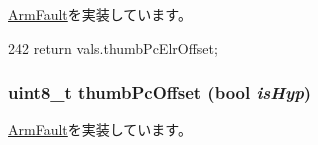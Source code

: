 \hyperlink{classArmISA_1_1ArmFault_a846a83fa30036c124fe623647dd70c5d}{ArmFault}を実装しています。


\begin{DoxyCode}
242 { return vals.thumbPcElrOffset; }
\end{DoxyCode}
\hypertarget{classArmISA_1_1ArmFaultVals_ad8a859e85912fae683d889d24bedfe08}{
\subsubsection[{thumbPcOffset}]{\setlength{\rightskip}{0pt plus 5cm}uint8\_\-t thumbPcOffset (bool {\em isHyp})}}
\label{classArmISA_1_1ArmFaultVals_ad8a859e85912fae683d889d24bedfe08}


\hyperlink{classArmISA_1_1ArmFault_a5622623cc4ac5dfcc5b2c78c41997ce4}{ArmFault}を実装しています。



